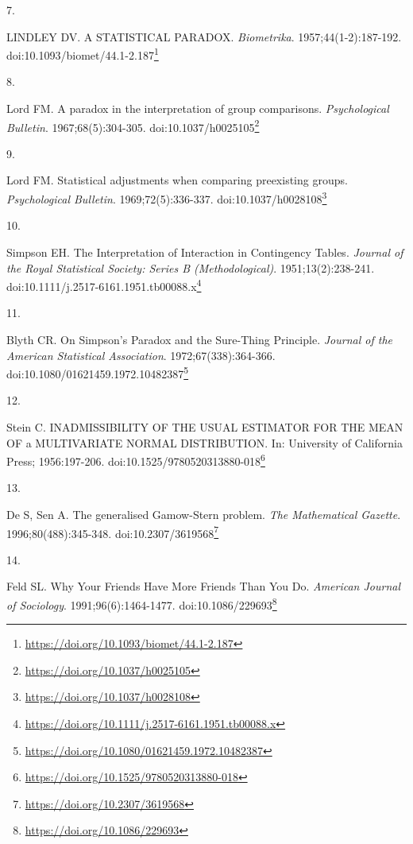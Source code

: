 \documentclass[
]{book}
\newlength{\cslhangindent}
\newlength{\csllabelwidth}
\newlength{\cslentryspacingunit} %
\newenvironment{CSLReferences}[2] %
 {%
  \setlength{\parindent}{0pt}
  \ifodd #1
  \let\oldpar\par
  \def\par{\hangindent=\cslhangindent\oldpar}
  \fi
  \setlength{\parskip}{#2\cslentryspacingunit}
 }%
 {}
\newcommand{\CSLLeftMargin}[1]{\parbox[t]{\csllabelwidth}{#1}}
\newcommand{\CSLRightInline}[1]{\parbox[t]{\linewidth - \csllabelwidth}{#1}\break}
\renewcommand{\href}[2]{#2\footnote{\url{#1}}}
\begin{document}
\begin{CSLReferences}{0}{0}
\leavevmode{}%
\CSLLeftMargin{7. }%
\CSLRightInline{LINDLEY DV. A STATISTICAL PARADOX. \emph{Biometrika}. 1957;44(1-2):187-192. doi:\href{https://doi.org/10.1093/biomet/44.1-2.187}{10.1093/biomet/44.1-2.187}}

\leavevmode{}%
\CSLLeftMargin{8. }%
\CSLRightInline{Lord FM. A paradox in the interpretation of group comparisons. \emph{Psychological Bulletin}. 1967;68(5):304-305. doi:\href{https://doi.org/10.1037/h0025105}{10.1037/h0025105}}

\leavevmode{}%
\CSLLeftMargin{9. }%
\CSLRightInline{Lord FM. Statistical adjustments when comparing preexisting groups. \emph{Psychological Bulletin}. 1969;72(5):336-337. doi:\href{https://doi.org/10.1037/h0028108}{10.1037/h0028108}}

\leavevmode{}%
\CSLLeftMargin{10. }%
\CSLRightInline{Simpson EH. The Interpretation of Interaction in Contingency Tables. \emph{Journal of the Royal Statistical Society: Series B (Methodological)}. 1951;13(2):238-241. doi:\href{https://doi.org/10.1111/j.2517-6161.1951.tb00088.x}{10.1111/j.2517-6161.1951.tb00088.x}}

\leavevmode{}%
\CSLLeftMargin{11. }%
\CSLRightInline{Blyth CR. On Simpson's Paradox and the Sure-Thing Principle. \emph{Journal of the American Statistical Association}. 1972;67(338):364-366. doi:\href{https://doi.org/10.1080/01621459.1972.10482387}{10.1080/01621459.1972.10482387}}

\leavevmode{}%
\CSLLeftMargin{12. }%
\CSLRightInline{Stein C. INADMISSIBILITY OF THE USUAL ESTIMATOR FOR THE MEAN OF a MULTIVARIATE NORMAL DISTRIBUTION. In: University of California Press; 1956:197-206. doi:\href{https://doi.org/10.1525/9780520313880-018}{10.1525/9780520313880-018}}

\leavevmode{}%
\CSLLeftMargin{13. }%
\CSLRightInline{De S, Sen A. The generalised Gamow-Stern problem. \emph{The Mathematical Gazette}. 1996;80(488):345-348. doi:\href{https://doi.org/10.2307/3619568}{10.2307/3619568}}

\leavevmode{}%
\CSLLeftMargin{14. }%
\CSLRightInline{Feld SL. Why Your Friends Have More Friends Than You Do. \emph{American Journal of Sociology}. 1991;96(6):1464-1477. doi:\href{https://doi.org/10.1086/229693}{10.1086/229693}}


\end{CSLReferences}
\end{document}
